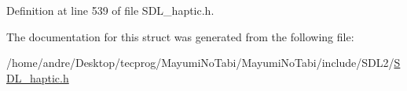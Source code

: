 Definition at line 539 of file S\-D\-L\-\_\-haptic.\-h.



The documentation for this struct was generated from the following file\-:\begin{DoxyCompactItemize}
\item 
/home/andre/\-Desktop/tecprog/\-Mayumi\-No\-Tabi/\-Mayumi\-No\-Tabi/include/\-S\-D\-L2/\hyperlink{_s_d_l__haptic_8h}{S\-D\-L\-\_\-haptic.\-h}\end{DoxyCompactItemize}
